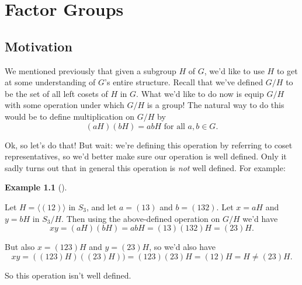 \documentclass[10pt,]{book}
\theoremstyle{plain}
\theoremstyle{definition}
\theoremstyle{definition}
\theoremstyle{definition}
\newtheorem{example}[theorem]{Example}
\theoremstyle{definition}
\numberwithin{equation}{section}
\begin{document}
\chapter[{Factor Groups}]{Factor Groups}\label{factorgps}
\typeout{************************************************}
\typeout{************************************************}
\section[{Motivation}]{Motivation}\label{section-25}

    We mentioned previously that given a subgroup \(H\) of \(G\), we'd like
    to use \(H\) to get at some understanding of \(G\)'s entire structure.
    Recall that we've defined \(G/H\) to be the set of all left cosets of
    \(H\) in \(G\). What we'd like to do now is equip \(G/H\) with some
    operation under which \(G/H\) is a group! The natural way to do this
    would be to define multiplication on \(G/H\) by
\begin{equation*}

      (aH)(bH)=abH \text{ for all } a,b\in G.
    
\end{equation*}

\par

    Ok, so let's do that! But wait: we're defining this operation
    by referring to coset representatives, so we'd better make sure
    our operation is well defined. Only it sadly turns out that in
    general this operation is \emph{not} well defined. For
    example:
\begin{example}[]\label{example-79}

        Let \(H=\langle (12)\rangle\) in \(S_3\), and let \(a=(13)\) and
        \(b=(132)\). Let \(x=aH\) and \(y=bH\) in \(S_3/H\). Then using the
        above-defined operation on \(G/H\) we'd have
\begin{equation*}

          xy=(aH)(bH)=abH=(13)(132)H=(23)H.
        
\end{equation*}

\par

        But also \(x=(123)H\) and \(y=(23)H\), so
        we'd also have
\begin{equation*}

          xy=((123)H)((23)H))=(123)(23)H=(12)H=H\neq (23)H.
        
\end{equation*}

\par

        So this operation isn't well defined.
\end{example}
\par
\end{document}
